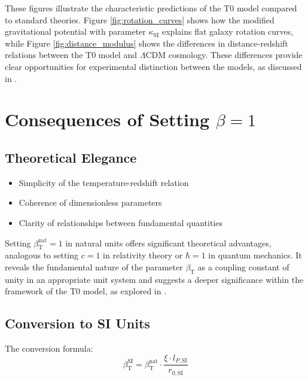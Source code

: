 \documentclass[12pt,a4paper]{article}
\newcommand{\betaT}{\beta_{\text{T}}}
\begin{document}
	These figures illustrate the characteristic predictions of the T0 model compared to standard theories. Figure \ref{fig:rotation_curves} shows how the modified gravitational potential with parameter \(\kappa_{\text{SI}}\) explains flat galaxy rotation curves, while Figure \ref{fig:distance_modulus} shows the differences in distance-redshift relations between the T0 model and \(\Lambda\)CDM cosmology. These differences provide clear opportunities for experimental distinction between the models, as discussed in \cite{pascher_messdifferenzen_2025}.
	
	\section{Consequences of Setting \(\beta = 1\)}
	\label{sec:consequences_beta}
	
	\subsection{Theoretical Elegance}
	\label{subsec:theoretical_elegance}
	
	\begin{itemize}
		\item Simplicity of the temperature-redshift relation
		\item Coherence of dimensionless parameters
		\item Clarity of relationships between fundamental quantities
	\end{itemize}
	
	Setting \(\betaT^{\text{nat}} = 1\) in natural units offers significant theoretical advantages, analogous to setting \(c = 1\) in relativity theory or \(\hbar = 1\) in quantum mechanics. It reveals the fundamental nature of the parameter \(\betaT\) as a coupling constant of unity in an appropriate unit system and suggests a deeper significance within the framework of the T0 model, as explored in \cite{pascher_alphabeta_2025}.
	
	\subsection{Conversion to SI Units}
	\label{subsec:conversion_to_si}
	
	The conversion formula:
	\begin{equation}
		\betaT^{\text{SI}} = \betaT^{\text{nat}} \cdot \frac{\xi \cdot l_{P,\text{SI}}}{r_{0,\text{SI}}}
	\end{equation}
	
\end{document}
